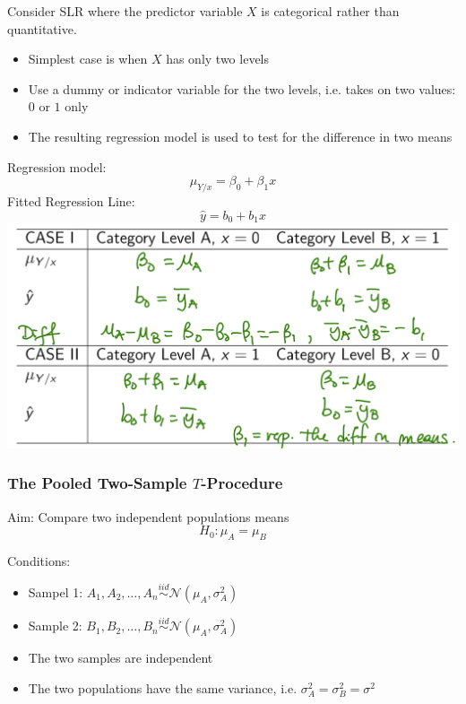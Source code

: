 \documentclass[11pt]{article}
\theoremstyle{definition}
\numberwithin{equation}{section}
\begin{document}
Consider SLR where the predictor variable $X$ is categorical rather than quantitative.
\begin{itemize}
  \item Simplest case is when $X$ has only two levels
  \item Use a dummy or indicator variable for the two levels, i.e. takes on two values: $0$ or $1$ only
  \item The resulting regression model is used to test for the difference in two means
\end{itemize}

Regression model:
\begin{equation}
  \mu_{Y/x} = \beta_0 + \beta_1x
\end{equation}
Fitted Regression Line:
\begin{equation}
  \hat{y} = b_0 + b_1x
\end{equation}
\includegraphics[width=\textwidth]{images/dummy-table}
\subsubsection{The Pooled Two-Sample $T$-Procedure}
Aim: Compare two independent populations means
\begin{equation*}
  H_0: \mu_A = \mu_B
\end{equation*}

Conditions:
\begin{itemize}
  \item Sampel 1: $A_1, A_2, \dots, A_n\stackrel{iid}{\sim}\mathcal{N}(\mu_A,\sigma_A^2)$
  \item Sample 2: $B_1, B_2, \dots, B_n\stackrel{iid}{\sim}\mathcal{N}(\mu_A,\sigma_A^2)$
  \item The two samples are independent
  \item The two populations have the same variance, i.e. $\sigma_A^2=\sigma_B^2=\sigma^2$
\end{itemize}
\end{document}
